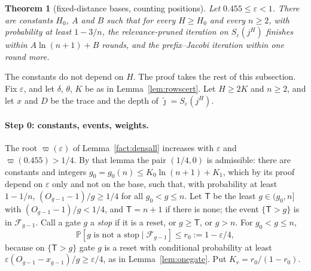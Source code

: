\documentclass[11pt]{amsart}
\newtheorem{theorem}{Theorem}
\theoremstyle{definition}
\theoremstyle{remark}
\newcommand{\eps}{\varepsilon}
\newcommand{\jt}{\tilde{\jmath}}
\newcommand{\PP}{\mathbb{P}}
\newcommand{\cF}{\mathcal{F}}
\begin{document}
\begin{theorem}[fixed-distance bases, counting positions]\label{thm:rows}
Let $0.455\le\eps<1$. There are constants $H_0$, $A$ and $B$ such that for every $H\ge H_0$ and
every $n\ge2$, with probability at least $1-3/n$, the relevance-pruned iteration on
$S_\eps(j^H)$ finishes within $A\ln(n+1)+B$ rounds, and the prefix--Jacobi iteration within one
round more.
\end{theorem}

\noindent The constants do not depend on $H$. The proof takes the rest of this subsection. Fix
$\eps$, and let $\delta$, $\theta$, $K$ be as in Lemma~\ref{lem:rowscert}. Let $H\ge2K$ and
$n\ge2$, and let $x$ and $D$ be the trace and the depth of $\jt=S_\eps(j^H)$.

\paragraph{Step 0: constants, events, weights.}
The root $\varpi(\eps)$ of Lemma~\ref{fact:densall} increases with $\eps$ and
$\varpi(0.455)>1/4$. By that lemma the pair $(1/4,0)$ is admissible: there are constants and
integers $g_0=g_0(n)\le K_0\ln(n+1)+K_1$, which by its proof depend on $\eps$ only and not on the
base, such that, with probability at least $1-1/n$,
$(O_{g-1}-1)/g\ge1/4$ for all $g_0<g\le n$. Let $\mathsf T$ be the least $g\in(g_0,n]$ with
$(O_{g-1}-1)/g<1/4$, and $\mathsf T=n+1$ if there is none; the event $\{\mathsf T>g\}$ is in
$\cF_{g-1}$. Call a gate $g$ a \emph{stop} if it is a reset, or $g\ge\mathsf T$, or $g>n$. For
$g_0<g\le n$,
\begin{equation}\label{eq:rowsstop}
\PP[g\text{ is not a stop}\mid\cF_{g-1}]\le r_0:=1-\eps/4,
\end{equation}
because on $\{\mathsf T>g\}$ gate $g$ is a reset with conditional probability at least
$\eps(O_{g-1}-x_{g-1})/g\ge\eps/4$, as in Lemma~\ref{lem:onegate}. Put $K_r=r_0/(1-r_0)$.
\end{document}
